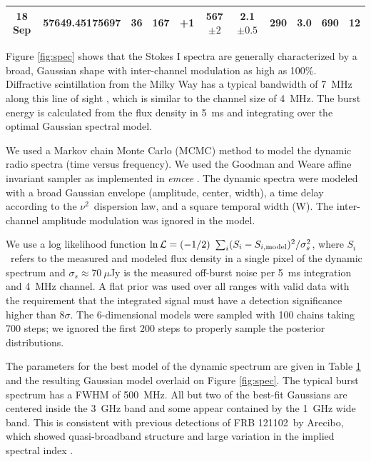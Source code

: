 \documentclass[twocolumn]{aastex61}
\newcommand{\frb}{FRB 121102}
\begin{document}
\begin{table}
\begin{tabular}{cc|rrr|ccrrrr}
18 Sep\tablenotemark{a} & 57649.45175697   & 36 		& 167 & +1			& 567$\pm2$ 		& 2.1$\pm0.5$		 	& 290 		& 3.0 		& 690 & 12 			\\ \hline
\end{tabular}
\label{tab:spec}
\end{table} 

Figure \ref{fig:spec} shows that the Stokes I spectra are generally characterized by a broad, Gaussian shape with inter-channel modulation as high as 100\%. Diffractive scintillation from the Milky Way has a typical bandwidth of 7~MHz along this line of sight \citep{2002astro.ph..7156C}, which is similar to the channel size of 4~MHz. The burst energy is calculated from the flux density in 5~ms and integrating over the optimal Gaussian spectral model.

We used a Markov chain Monte Carlo (MCMC) method to model the dynamic radio spectra (time versus frequency). We used the Goodman and Weare affine invariant sampler \citep{goodman2010ensemble} as implemented in \emph{emcee} \citep{2013PASP..125..306F}. The dynamic spectra were modeled with a broad Gaussian envelope (amplitude, center, width), a time delay according to the $\nu^2$\ dispersion law, and a square temporal width (W). The inter-channel amplitude modulation was ignored in the model.

We use a log likelihood function $\ln \mathcal{L}=(-1/2)\ \sum_i (S_i - S_{i, \rm{model}})^2/\sigma_s^2$, where $S_i$\ refers to the measured and modeled flux density in a single pixel of the dynamic spectrum and $\sigma_s\approx 70\ \mu$Jy is the measured off-burst noise per 5~ms integration and 4~MHz channel. A flat prior was used over all ranges with valid data with the requirement that the integrated signal must have a detection significance higher than 8$\sigma$. The 6-dimensional models were sampled with 100 chains taking 700 steps; we ignored the first 200 steps to properly sample the posterior distributions. 

The parameters for the best model of the dynamic spectrum are given in Table \ref{tab:spec} and the resulting Gaussian model overlaid on Figure \ref{fig:spec}. The typical burst spectrum has a FWHM of 500~MHz. All but two of the best-fit Gaussians are centered inside the 3~GHz band and some appear contained by the 1~GHz wide band. This is consistent with previous detections of \frb\ by Arecibo, which showed quasi-broadband structure \citep{2016arXiv160308880S} and large variation in the implied spectral index \citep{2014ApJ...790..101S}. 
\end{document}
